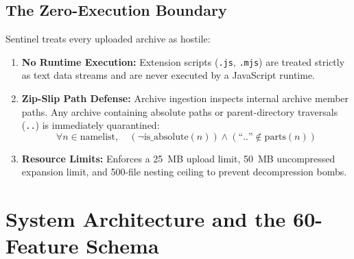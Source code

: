 \documentclass[conference]{IEEEtran}
\begin{document}
\subsection{The Zero-Execution Boundary}
Sentinel treats every uploaded archive as hostile:
\begin{enumerate}
    \item \textbf{No Runtime Execution:} Extension scripts (\texttt{.js}, \texttt{.mjs}) are treated strictly as text data streams and are never executed by a JavaScript runtime.
    \item \textbf{Zip-Slip Path Defense:} Archive ingestion inspects internal archive member paths. Any archive containing absolute paths or parent-directory traversals (\texttt{..}) is immediately quarantined:
    \begin{equation}
        \forall n \in \text{namelist}, \quad (\neg \text{is\_absolute}(n)) \land (\text{``..''} \notin \text{parts}(n))
    \end{equation}
    \item \textbf{Resource Limits:} Enforces a 25~MB upload limit, 50~MB uncompressed expansion limit, and 500-file nesting ceiling to prevent decompression bombs.
\end{enumerate}

\section{System Architecture and the 60-Feature Schema}
\end{document}
